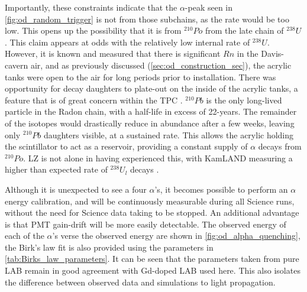 %

\par
Importantly, these constraints indicate that the $\alpha$-peak seen in \autoref{fig:od_random_trigger} is not from those subchains, as the rate would be too low.
This opens up the possibility that it is from ${}^{210}Po$ from the late chain of ${}^{238}U$.
This claim appears at odds with the relatively low internal rate of ${}^{238}U$.
However, it is known and measured that there is significant $Rn$ in the Davis-cavern air, and as previously discussed (\autoref{sec:od_construction_sec}), the acrylic tanks were open to the air for long periods prior to installation.
There was opportunity for decay daughters to plate-out on the inside of the acrylic tanks, a feature that is of great concern within the TPC \cite{radon_plateout_ref}.
${}^{210}Pb$ is the only long-lived particle in the Radon chain, with a half-life in excess of 22-years. 
The remainder of the isotopes would drastically reduce in abundance after a few weeks, leaving only ${}^{210}Pb$ daughters visible, at a sustained rate.
This allows the acrylic holding the scintillator to act as a reservoir, providing a constant supply of $\alpha$ decays from ${}^{210}Po$.
LZ is not alone in having experienced this, with KamLAND measuring a higher than expected rate of ${}^{238}U_l$ decays \cite{KamLAND_LS_contaminants_ref}.

\par
Although it is unexpected to see a four $\alpha$'s, it becomes possible to perform an $\alpha$ energy calibration, and will be continuously measurable during all Science runs, without the need for Science data taking to be stopped.
An additional advantage is that PMT gain-drift will be more easily detectable.
The observed energy of each of the $\alpha$'s verse the observed energy are shown in \autoref{fig:od_alpha_quenching}, the Birk's law fit is also provided using the parameters in \autoref{tab:Birks_law_parameters}.
It can be seen that the parameters taken from pure LAB remain in good agreement with Gd-doped LAB used here.
This also isolates the difference between observed data and simulations to light propagation.








